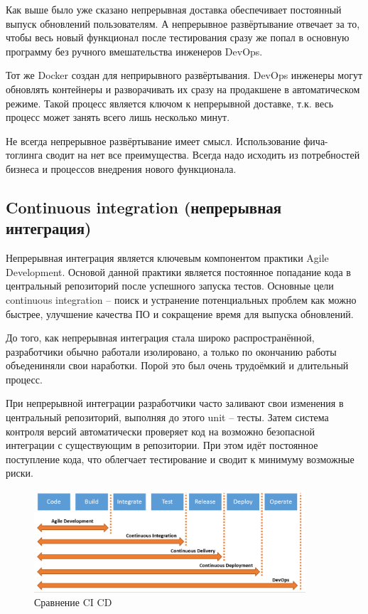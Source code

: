 Как выше было уже сказано непрерывная доставка обеспечивает постоянный выпуск обновлений пользователям. А непрерывное развёртывание отвечает за то, чтобы весь новый функционал после тестирования сразу же попал в основную программу без ручного вмешательства инженеров DevOps.

Тот же Docker создан для неприрывного развёртывания. DevOps инженеры могут обновлять контейнеры и разворачивать их сразу на продакшене в автоматическом режиме. Такой процесс является ключом к непрерывной доставке, т.к. весь процесс может занять всего лишь несколько минут.

Не всегда непрерывное развёртывание имеет смысл. Использование фича-тоглинга сводит на нет все преимущества. Всегда надо исходить из потребностей бизнеса и процессов внедрения нового функционала.

\subsection{Continuous integration (непрерывная интеграция)}

Непрерывная интеграция является ключевым компонентом практики Agile Development. Основой данной практики является постоянное попадание кода в центральный репозиторий после успешного запуска тестов. Основные цели continuous integration – поиск и устранение потенциальных проблем как можно быстрее, улучшение качества ПО и сокращение время для выпуска обновлений.

До того, как непрерывная интеграция стала широко распространённой, разработчики обычно работали изолировано, а только по окончанию работы объедениняли свои наработки. Порой это был очень трудоёмкий и длительный процесс.

При непрерывной интеграции разработчики часто заливают свои изменения в центральный репозиторий, выполняя до этого unit – тесты. Затем система контроля версий автоматически проверяет код на возможно безопасной интеграции с существующим в репозитории. При этом идёт постоянное поступление кода, что облегчает тестирование и сводит к минимуму возможные риски.

\begin{figure}[h!]
\centering
\includegraphics[width=0.9\textwidth]{ci-vs-cd-devops-difference}
\caption{Сравнение CI CD}
\label{fig5}
\end{figure}

